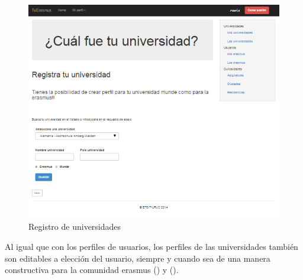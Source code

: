 \begin{figure}[htbp]
	
	\centering
	\includegraphics[scale=0.4]{./Figuras/tuerasmusPages/privatePages/uniRegister.png}
	\caption{Registro de universidades}
	\label{fig:uniReg}
	
\end{figure}

Al igual que con los perfiles de usuarios, los perfiles de las universidades tambi\'en son editables a elecci\'on del usuario, siempre y cuando sea de una manera constructiva para la comunidad erasmus (\textit{}) y (\textit{}).\\

